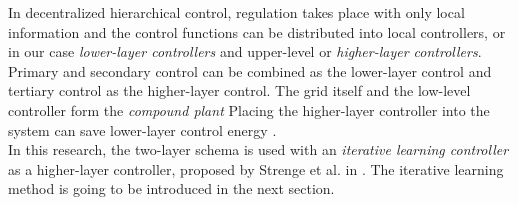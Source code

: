 In decentralized hierarchical control, regulation takes place with only local information \cite{controldc_energy_man} and the control functions can be distributed into local controllers, or in our case \textit{lower-layer controllers} and upper-level or \textit{higher-layer controllers}. Primary and secondary control can be combined as the lower-layer control and tertiary control as the higher-layer control. The grid itself and the low-level controller form the \textit{compound plant} Placing the higher-layer controller into the system can save lower-layer control energy \cite{paperilc}. \\ In this research, the two-layer schema is used with an \textit{iterative learning controller} as a higher-layer controller, proposed by Strenge et al. in \cite{paperilc}. The iterative learning method is going to be introduced in the next section.

